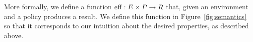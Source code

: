 More formally, we define a function $\operatorname{eff} : E \times P \rightarrow R$
that, given an environment and a policy produces a result.  We define
this function in Figure~\ref{fig:semantics} so that it corresponds to
our intuition about the desired properties, as described above.


